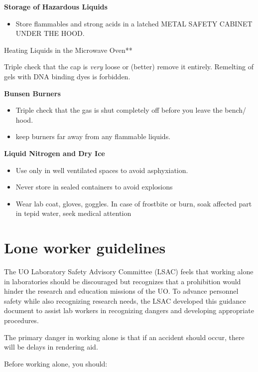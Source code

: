 \documentclass[
]{book}
\providecommand{\tightlist}{%
  \setlength{\itemsep}{0pt}\setlength{\parskip}{0pt}}
\begin{document}
\textbf{Storage of Hazardous Liquids}

\begin{itemize}
\tightlist
\item
  Store flammables and strong acids in a latched METAL SAFETY CABINET UNDER THE HOOD.
\end{itemize}

Heating Liquids in the Microwave Oven**

Triple check that the cap is \emph{very} loose or (better) remove it entirely. Remelting of gels with DNA binding dyes is forbidden.

\textbf{Bunsen Burners}

\begin{itemize}
\item
  Triple check that the gas is shut completely off before you leave the bench/ hood.
\item
  keep burners far away from any flammable liquids.
\end{itemize}

\textbf{Liquid Nitrogen and Dry Ice}

\begin{itemize}
\item
  Use only in well ventilated spaces to avoid asphyxiation.
\item
  Never store in sealed containers to avoid explosions
\item
  Wear lab coat, gloves, goggles. In case of frostbite or burn, soak affected part in tepid water, seek medical attention
\end{itemize}

\hypertarget{lone-worker-guidelines}{%
\chapter{Lone worker guidelines}\label{lone-worker-guidelines}}

The UO Laboratory Safety Advisory Committee (LSAC) feels that working alone in laboratories should be discouraged but recognizes that a prohibition would hinder the research and education missions of the UO. To advance personnel safety while also recognizing research needs, the LSAC developed this guidance document to assist lab workers in recognizing dangers and developing appropriate procedures.

The primary danger in working alone is that if an accident should occur, there will be delays in rendering aid.

Before working alone, you should:
\end{document}
